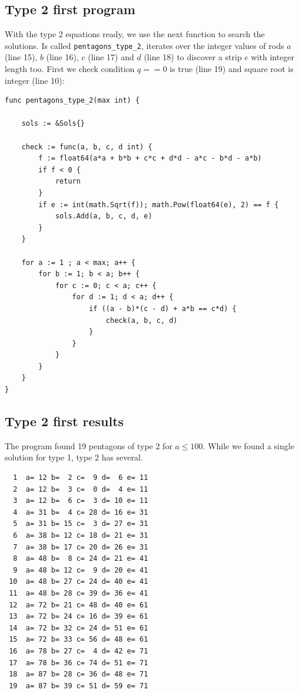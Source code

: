 \documentclass[11pt]{article}
\begin{document}
\subsection{Type 2 first program}

With the type 2 equations ready, we use the next function to search the solutions.
Is called \texttt{pentagons\_type\_2}, iterates over the integer values of rods 
$a$ (line 15), $b$ (line 16), $c$ (line 17) and $d$ (line 18)
to discover a strip $e$ with integer length too. First we check condition $q == 0$ is
true (line 19) and square root is integer (line 10):
\begin{lstlisting}
func pentagons_type_2(max int) {

	sols := &Sols{}

	check := func(a, b, c, d int) {
		f := float64(a*a + b*b + c*c + d*d - a*c - b*d - a*b)
	    if f < 0 {
	    	return
	    }
		if e := int(math.Sqrt(f)); math.Pow(float64(e), 2) == f {
			sols.Add(a, b, c, d, e)
		}
	}

    for a := 1 ; a < max; a++ {
    	for b := 1; b < a; b++ {
        	for c := 0; c < a; c++ {
          		for d := 1; d < a; d++ {
            		if ((a - b)*(c - d) + a*b == c*d) {
              			check(a, b, c, d)
              		}
              	}
            }
        }
    }
}
\end{lstlisting}

\subsection{Type 2 first results}
The program found 19 pentagons of type 2 for $a \leq 100$.
While we found a single solution for type 1, type 2 has several.

\begin{lstlisting}
  1  a= 12 b=  2 c=  9 d=  6 e= 11
  2  a= 12 b=  3 c=  0 d=  4 e= 11
  3  a= 12 b=  6 c=  3 d= 10 e= 11
  4  a= 31 b=  4 c= 28 d= 16 e= 31
  5  a= 31 b= 15 c=  3 d= 27 e= 31
  6  a= 38 b= 12 c= 18 d= 21 e= 31
  7  a= 38 b= 17 c= 20 d= 26 e= 31
  8  a= 48 b=  8 c= 24 d= 21 e= 41
  9  a= 48 b= 12 c=  9 d= 20 e= 41
 10  a= 48 b= 27 c= 24 d= 40 e= 41
 11  a= 48 b= 28 c= 39 d= 36 e= 41
 12  a= 72 b= 21 c= 48 d= 40 e= 61
 13  a= 72 b= 24 c= 16 d= 39 e= 61
 14  a= 72 b= 32 c= 24 d= 51 e= 61
 15  a= 72 b= 33 c= 56 d= 48 e= 61
 16  a= 78 b= 27 c=  4 d= 42 e= 71
 17  a= 78 b= 36 c= 74 d= 51 e= 71
 18  a= 87 b= 28 c= 36 d= 48 e= 71
 19  a= 87 b= 39 c= 51 d= 59 e= 71
\end{lstlisting}
\end{document}
